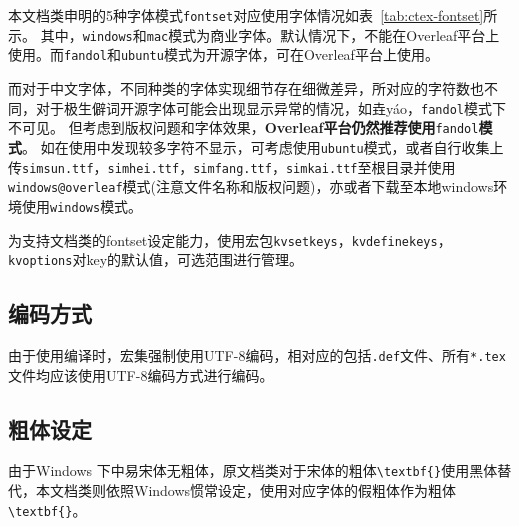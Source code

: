 本文档类申明的5种字体模式\verb|fontset|对应使用字体情况如表~\ref{tab:ctex-fontset}所示。
其中，\verb|windows|和\verb|mac|模式为商业字体。默认情况下，不能在Overleaf平台上使用。而\verb|fandol|和\verb|ubuntu|模式为开源字体，可在Overleaf平台上使用。

而对于中文字体，不同种类的字体实现细节存在细微差异，所对应的字符数也不同，对于极生僻词开源字体可能会出现显示异常的情况，如垚y\'ao，\verb|fandol|模式下不可见。
但考虑到版权问题和字体效果，\textbf{Overleaf平台仍然推荐使用}\verb|fandol|\textbf{模式}。
如在使用中发现较多字符不显示，可考虑使用\verb|ubuntu|模式，或者自行收集上传\verb|simsun.ttf|，\verb|simhei.ttf|，\verb|simfang.ttf|，\verb|simkai.ttf|至根目录并使用\verb|windows@overleaf|模式(注意文件名称和版权问题)，亦或者下载至本地windows环境使用\verb|windows|模式。

为支持文档类的fontset设定能力，使用宏包\verb|kvsetkeys|，\verb|kvdefinekeys|，\verb|kvoptions|对key的默认值，可选范围进行管理。

\subsection{编码方式}
\label{sec:overleaf-encoding}

由于使用\XeLaTeX{}编译时，\CTeX{}宏集强制使用UTF-8编码，相对应的包括\verb|.def|文件、所有\verb|*.tex|文件均应该使用UTF-8编码方式进行编码。

\subsection{粗体设定}

由于Windows 下中易宋体无粗体，原文档类\pkuthss{}对于宋体的粗体\verb|\textbf{}|使用黑体替代，本文档类\iofupkuthss{}则依照Windows惯常设定，使用对应字体的假粗体作为粗体\verb|\textbf{}|。
